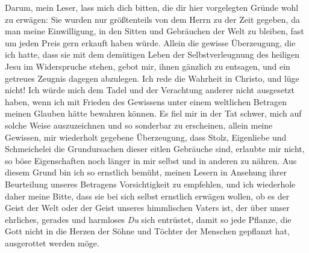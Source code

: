 Darum, mein Leser, lass mich dich bitten, die dir hier vorgelegten Gründe wohl
zu
erwägen: Sie wurden nur größtenteils von dem Herrn zu der Zeit gegeben, da man
meine Einwilligung, in den Sitten und Gebräuchen der Welt zu bleiben, fast um
jeden Preis gern erkauft haben würde. Allein die gewisse Überzeugung, die ich
hatte, dass sie mit dem demütigen Leben der Selbstverleugnung des heiligen Jesu
im Widerspruche stehen, gebot mir, ihnen gänzlich zu entsagen, und ein getreues
Zeugnis dagegen abzulegen. Ich rede die Wahrheit in
Christo, und lüge nicht! Ich
würde mich dem Tadel und der Verachtung anderer nicht ausgesetzt haben, wenn ich
mit Frieden des Gewissens unter einem weltlichen Betragen meinen Glauben hätte
bewahren können. Es fiel mir in der Tat schwer, mich auf solche Weise
auszuzeichnen und so sonderbar zu erscheinen, allein meine Gewissen, mir
wiederholt gegebene Überzeugung, dass Stolz, Eigenliebe und Schmeichelei die
Grundursachen dieser eitlen Gebräuche sind, erlaubte mir nicht, so böse
Eigenschaften noch länger in mir selbst und in anderen zu nähren. Aus diesem
Grund bin ich so ernstlich bemüht, meinen Lesern in Ansehung ihrer
Beurteilung unseres Betragens Vorsichtigkeit zu empfehlen, und ich wiederhole
daher meine Bitte, dass sie bei sich selbst ernstlich erwägen wollen, ob es der
Geist der Welt oder der Geist unseres himmlischen Vaters ist, der über unser
ehrliches, gerades und harmloses \textit{Du} sich entrüstet, damit so jede
Pflanze,
die Gott nicht in die Herzen der Söhne und Töchter der Menschen gepflanzt hat,
ausgerottet werden möge.

\label{kap10_ende}


